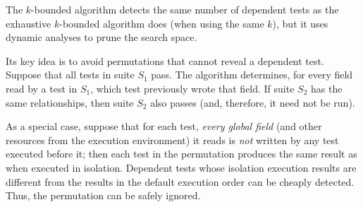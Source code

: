 %
%
%



The \dependenceaware{} $k$-bounded algorithm
detects the same number
of dependent tests
as the exhaustive $k$-bounded algorithm does (when using the same $k$),
but it uses dynamic analyses to prune the search space.

Its key idea is to avoid permutations that cannot reveal a dependent test.
Suppose that all tests in suite $S_1$ pass.  The algorithm determines, for
every field read by a test in $S_1$, which test previously wrote that field.
If suite $S_2$ has the same relationships, then suite $S_2$ also passes
(and, therefore, it need not be run).



As a
special case, suppose that for each test,
\textit{every global field} (and other 
resources from the execution environment) it reads
is \textit{not} written by any test executed before it; then
each test in the permutation produces
the same result as when executed in isolation.
Dependent tests whose isolation execution results
are different from the results in the default execution order
can be cheaply detected.
Thus, the permutation can be safely ignored. 

